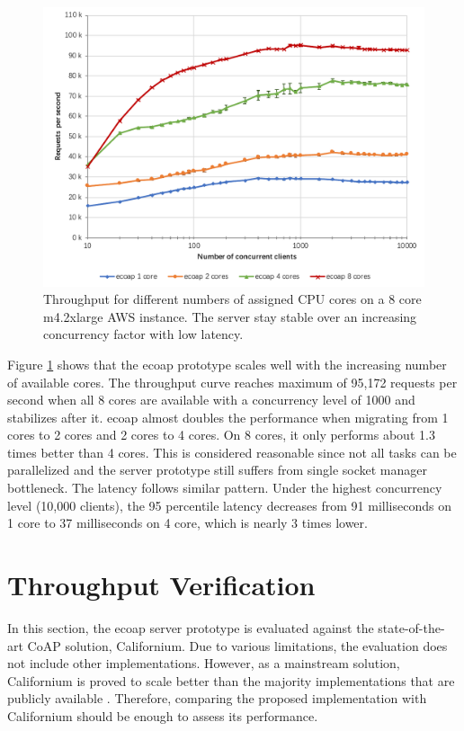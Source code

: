 \begin{figure}[!htbp]
\centering
\includegraphics[scale = 0.8]{vertical_scalability}
\caption[Throughput for different numbers of assigned CPU cores on a 8 core m4.2xlarge AWS instance]{Throughput for different numbers of assigned CPU cores on a 8 core m4.2xlarge AWS instance. The server stay stable over an increasing concurrency factor with low latency.}
\label{fig:scalability}
\end{figure}

Figure \ref{fig:scalability} shows that the ecoap prototype scales well with the increasing number of available cores. The throughput curve reaches maximum of 95,172 requests per second when all 8 cores are available with a concurrency level of 1000 and stabilizes after it. ecoap almost doubles the performance when migrating from 1 cores to 2 cores and 2 cores to 4 cores. On 8 cores, it only performs about 1.3 times better than 4 cores. This is considered reasonable since not all tasks can be parallelized and the server prototype still suffers from single socket manager bottleneck. The latency follows similar pattern. Under the highest concurrency level (10,000 clients), the 95 percentile latency decreases from 91 milliseconds on 1 core to 37 milliseconds on 4 core, which is nearly 3 times lower.

\section{Throughput Verification}

In this section, the ecoap server prototype is evaluated against the state-of-the-art CoAP solution, Californium. Due to various limitations, the evaluation does not include other implementations. However, as a mainstream solution, Californium is proved to scale better than the majority implementations that are publicly available \cite{lanter2013scalability} \cite{kovatsch2014californium} \cite{kovatsch2015scalable}. Therefore, comparing the proposed implementation with Californium should be enough to assess its performance. 

